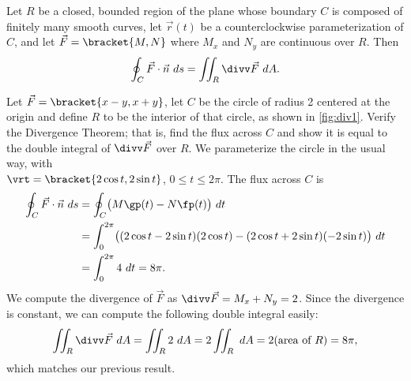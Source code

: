 \begin{theorem}\label{thm:divergence1}
Let $R$ be a closed, bounded region of the plane whose boundary $C$ is composed of finitely many smooth curves, let $\vec r(t)$ be a counterclockwise parameterization of $C$, and let $\vec F =\bracket{M,N}$ where $M_x$ and $N_y$ are continuous over $R$. Then
\[\oint_C \vec F\cdot \vec n\ ds = \iint_R\divv \vec F\ dA.\]
\end{theorem}


\begin{example}\label{ex_div1}
Let $\vec F =\bracket{x-y,x+y}$, let $C$ be the circle of radius 2 centered at the origin and define $R$ to be the interior of that circle, as shown in \autoref{fig:div1}. Verify the Divergence Theorem; that is, find the flux across $C$ and show it is equal to the double integral of $\divv \vec F$ over $R$.
\solution
We parameterize the circle in the usual way, with\\
$\vrt =\bracket{2\cos t,2\sin t}$, $0\leq t\leq 2\pi$. The flux across $C$ is
\begin{align*}
	\oint_C \vec F\cdot \vec n\ ds
	&= \oint_C\bigl(M\gp(t)-N\fp(t)\bigr)\ dt\\
	&= \int_0^{2\pi} \bigl((2\cos t-2\sin t)(2\cos t) - (2\cos t+2\sin t)(-2\sin t)\bigr)\ dt\\
	&= \int_0^{2\pi} 4\ dt = 8\pi.
\end{align*}
We compute the divergence of $\vec F$ as $\divv \vec F = M_x+N_y = 2$. Since the divergence is constant, we can compute the following double integral easily:
\[
\iint_R \divv \vec F\ dA = \iint_R 2\ dA = 2\iint_R\ dA
= 2(\text{area of $R$}) = 8\pi,
\]
which matches our previous result.
\end{example}

